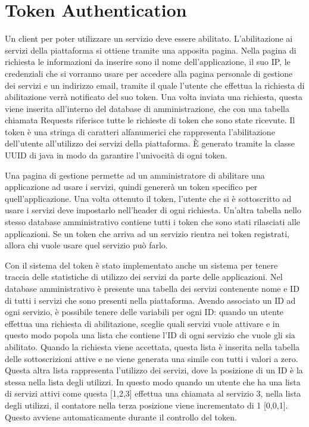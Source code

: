 \section{Token Authentication}
Un client per poter utilizzare un servizio deve essere abilitato. L'abilitazione ai servizi della piattaforma si ottiene tramite una apposita pagina. Nella pagina di richiesta le informazioni da inserire sono il nome dell’applicazione, il suo IP, le credenziali che si vorranno usare per accedere alla pagina personale di gestione dei servizi e un indirizzo email, tramite il quale l'utente che effettua la richiesta di abilitazione  verrà notificato del suo token. Una volta inviata una richiesta, questa viene inserita all’interno del database di amministrazione, che con una tabella chiamata Requests riferisce tutte le richieste di token che sono state ricevute. Il token è una stringa di caratteri alfanumerici che rappresenta l’abilitazione dell’utente all’utilizzo dei servizi della piattaforma. È generato tramite la classe UUID di java in modo da garantire l’univocità di ogni token.

Una pagina di gestione permette ad un amministratore di abilitare una applicazione ad usare i servizi, quindi genererà un token specifico per quell'applicazione.
Una volta ottenuto il token, l’utente che si è sottoscritto ad usare i servizi deve impostarlo nell’header di ogni richiesta. Un'altra tabella nello stesso database amministrativo contiene tutti i token che sono stati rilasciati alle applicazioni. Se un token che arriva ad un servizio rientra nei token registrati, allora chi vuole usare quel servizio può farlo.

Con il sistema del token è stato implementato anche un sistema per tenere traccia delle statistiche di utilizzo dei servizi da parte delle applicazioni. Nel database amministrativo è presente una tabella dei servizi contenente nome e ID di tutti i servizi che sono presenti nella piattaforma. Avendo associato un ID ad ogni servizio, è possibile tenere delle variabili per ogni ID: quando un utente effettua una richiesta di abilitazione, sceglie quali servizi vuole attivare e in questo modo popola una lista che contiene l’ID di ogni servizio che vuole gli sia abilitato. Quando la richiesta viene accettata, questa lista è inserita nella tabella delle sottoscrizioni attive e ne viene generata una simile con tutti i valori a zero. Questa altra lista rappresenta l’utilizzo dei servizi, dove la posizione di un ID è la stessa nella lista degli utilizzi. In questo modo quando un utente che ha una lista di servizi attivi come questa [1,2,3] effettua una chiamata al servizio 3, nella lista degli utilizzi, il contatore nella terza posizione viene incrementato di 1 [0,0,1]. Questo avviene automaticamente durante il controllo del token.
\clearpage
